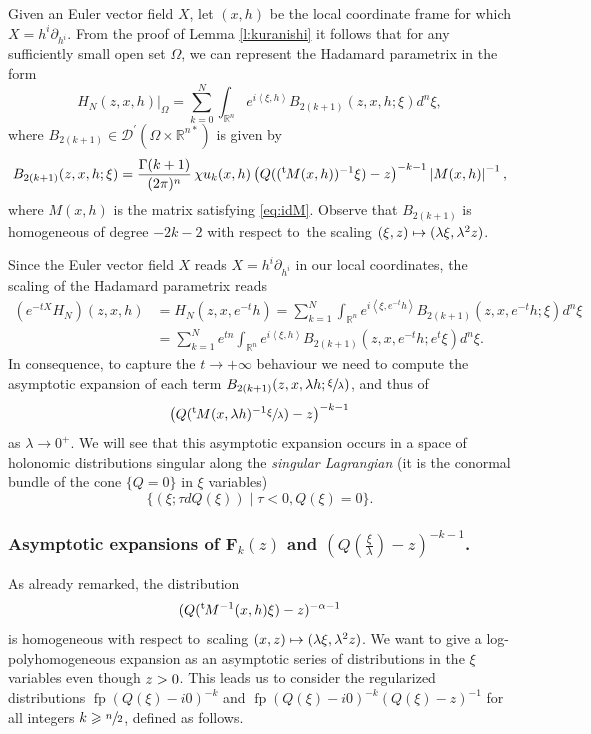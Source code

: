 \documentclass[10pt]{amsart}
\let\pazocal\mathscr
\def\mto{\mathchoice{\longmapsto}{\mapsto}{\mapsto}{\mapsto}}
\theoremstyle{definition}
\let\cv\alpha
\let\st\mid
\let\euler X
\let\Im\relax
\DeclareMathOperator{\Im}{Im}
\DeclareMathOperator*{\pf}{fp}
\newcommand{\module}[1]{\left|#1\right|}
\renewcommand{\t}{{{}^{\mathrm{t}\mkern-2mu}}}
\begin{document}
Given an Euler vector field $\euler$, let $(x,h)$ be the local coordinate
frame for which $\euler=h^i\partial_{h^i}$. From the proof of Lemma \ref{l:kuranishi} it follows that for any sufficiently small open set $\Omega$, we can represent the Hadamard parametrix in the form
\[
H_N(z,x,h)|_\Omega= \sum_{k=0}^N \int_{\mathbb{R}^n} e^{i\left\langle\xi,h\right\rangle} B_{2(k+1)}(z,x,h;\xi) d^n\xi,
\]
where $B_{2(k+1)}\in \pazocal{D}^\prime(\Omega\times \mathbb{R}^{n*})$ is given by
\begin{equation*}%
B_{2(k+1)}(z,x,h;\xi)=\frac{\Gamma(k+1)}{(2\pi)^{n}}\,\chi u_k(x,h) \left(Q((\t M(x,h))^{-1}\xi)-z \right)^{-k-1} \module{M(x,h)}^{-1},
\end{equation*}
where $M(x,h)$ is the matrix satisfying \eqref{eq:idM}. Observe that $B_{2(k+1)}$ is homogeneous of degree $-2k-2$ with respect to~the scaling
$ (\xi,z) \mto (\lambda\xi,\lambda^2z)$.

Since the Euler vector field $\euler$ reads
$\euler=h^i\partial_{h^i}$ in our local coordinates, the scaling of the Hadamard parametrix reads
\[
\begin{aligned}
{\left(e^{-t\euler} H_N\right)}(z,x,h)&=H_N(z,x,e^{-t}h)=
\sum_{k=1}^N \int_{\mathbb{R}^n} e^{i\left\langle\xi,e^{-t}h\right\rangle} B_{2(k+1)}(z,x,e^{-t}h;\xi) d^n\xi\\
&=\sum_{k=1}^N e^{tn} \int_{\mathbb{R}^n} e^{i\left\langle\xi,h\right\rangle} B_{2(k+1)}(z,x,e^{-t}h;e^{t}\xi) d^n\xi.
\end{aligned}
\]
In consequence, to capture the $t\to+\infty$ behaviour we need to compute the asymptotic expansion of
each term $ B_{2(k+1)}(z,x,\lambda h;\sfrac{\xi}{\lambda})$,
and thus of
\[
\big(Q(\t M(x,\lambda h)^{-1}\sfrac{\xi}{\lambda})-z\big)^{-k-1}
\]
as $\lambda\to 0^+$. We will see that this asymptotic expansion
occurs in a space of holonomic distributions singular along
the \emph{singular Lagrangian} (it is the conormal bundle of the cone $\{Q=0\}$ in $\xi$ variables)
\[
\{(\xi;\tau dQ(\xi)) \st \tau<0, Q(\xi)=0 \}.
\]

\subsubsection{Asymptotic expansions of $\mathbf{F}_k(z)$ and $(Q(\frac{\xi}{\lambda})-z)^{-k-1}$.} As already remarked,
the distribution
\[
(Q(\t M^{-1}(x,h) \xi)-z)^{-\cv-1}
\]
is homogeneous with respect to~scaling
$(x,z)\mto(\lambda\xi,\lambda^2z) $. We want to give a log-polyhomogeneous expansion as an asymptotic series of
distributions in the $\xi$ variables even though $\Im z>0$.
This leads us to consider the regularized distributions
\hbox{$\pf (Q(\xi)-i0)^{-k}$} and $\pf (Q(\xi)-i0)^{-k} (Q(\xi)-z)^{-1}$ for all integers $k\geqslant \sfrac{n}{2}$, defined as follows.
\end{document}
